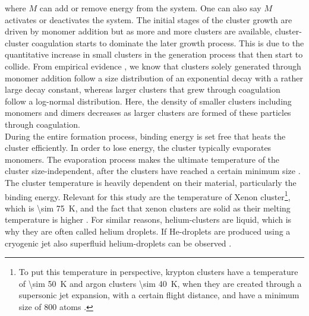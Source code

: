 where $M$ can add or remove energy from the system. One can also say $M$ activates or deactivates the system.
%
The initial stages of the cluster growth are driven by monomer addition but as more and more clusters are available, cluster-cluster coagulation starts to dominate the later growth process. This is due to the quantitative increase in small clusters in the generation process that then start to collide. From empirical evidence \citep{Zurek-1980-JCP,Soler-1982-PRL}, we know that clusters solely generated through monomer addition follow a size distribution of an exponential decay with a rather large decay constant, whereas larger clusters that grew through coagulation follow a log-normal distribution. Here, the density of smaller clusters including monomers and dimers decreases as larger clusters are formed of these particles through coagulation.\\[1\baselineskip]
During the entire formation process, binding energy is set free that heats the cluster efficiently. In order to lose energy, the cluster typically evaporates monomers. The evaporation process makes the ultimate temperature of the cluster size-independent, after the clusters have reached a certain minimum size \citep{Farges-1981-SurfSci}.
The cluster temperature is heavily dependent on their material, particularly the binding energy. Relevant for this study are the temperature of Xenon cluster\footnote{To put this temperature in perspective, krypton clusters have a temperature of \SI{\sim 50}{\kelvin} and argon clusters \SI{\sim 40}{\kelvin}, when they are created through a supersonic jet expansion, with a certain flight distance, and have a minimum size of 800 atoms \citep{Farges-1981-SurfSci,Gspann-1986-Springer}.}, which is \SI{\sim 75}{\kelvin}, and the fact that xenon clusters are solid as their melting temperature is higher \citep{Gspann-1986-Springer}. For similar reasons, helium-clusters are liquid, which is why they are often called helium droplets. If He-droplets are produced using a cryogenic jet also superfluid helium-droplets can be observed \citep{Gomez-2011-JCP}.\\[1\baselineskip]
%
